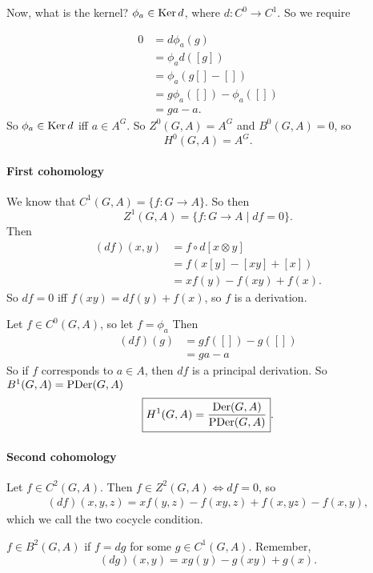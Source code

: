 Now, what is the kernel? $\phi_a \in \operatorname{Ker} d$, where $d: C^{0} \to  C^{1}$.
So we require

\begin{align*}
    0 & = d \phi_a(g)\\
      &= \phi_a d([g])\\
      &= \phi_a (g[] - [])\\
      &= g \phi_a([]) - \phi_a([])\\
      &= ga - a
.\end{align*}
So $\phi_a \in  \operatorname{Ker} d$ iff $a \in A^{G}$.
So 
$Z^{0}(G, A) = A^{G}$ and $B^{0}(G, A) = 0$, so 
\[
    \boxed{H^{0}(G, A) = A^{G}}
.\] 
\paragraph{First cohomology}
We know that $C^{1}(G, A)  = \{f: G \to  A\} $.
So then 
\[
    Z^{1}(G, A) = \{f:G \to  A  \mid  df = 0\} 
.\] 
Then
\begin{align*}
    (df)(x, y) &= f  \circ  d[x \otimes y]\\
               &= f (x[y] - [xy] + [x])\\
               &= xf(y) - f(xy) + f(x)
.\end{align*} 
So $df = 0$ iff  $f(xy) = df(y) + f(x)$, so  $f$ is a derivation. 


Let $f \in C^{0}(G, A)$, so let $f = \phi_a$
Then \begin{align*}
    (df)(g)&= g f([]) - g([])\\
           &= ga - a
\end{align*}
So if $f$ corresponds to $a \in A$, then $df$ is a principal derivation.
So $B^{1}(G, A) = \operatorname{PDer}(G, A)$
\[
    \boxed{H^{1}(G, A) = \frac{\operatorname{Der}(G, A)}{\operatorname{PDer}(G, A)}}
.\] 

\paragraph{Second cohomology}

Let $f \in C^{2}(G, A)$.
Then $f \in Z^2(G, A) \iff df = 0$, so
\begin{align*}
    (df)(x,y,z) = xf(y,z) - f(xy,z) + f(x,yz) - f(x,y)
,\end{align*}
which we call the two cocycle condition.

$f \in B^2(G, A)$ if $f = dg$ for some  $g \in C^{1}(G, A)$.
Remember,
\[
    (dg)(x, y) = xg(y) - g(xy) + g(x)
.\] 


